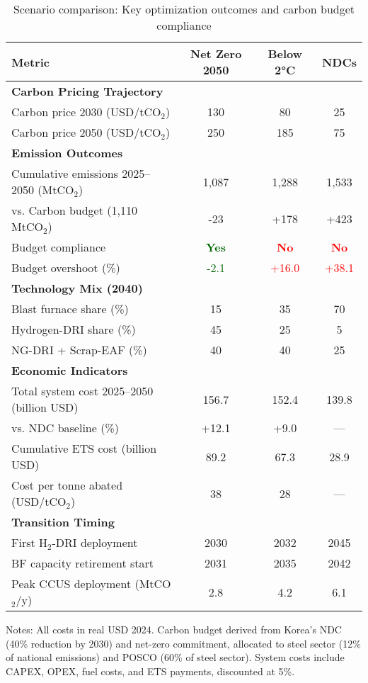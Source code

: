 \begin{table}[ht]
  \centering
  \caption{Scenario comparison: Key optimization outcomes and carbon budget compliance}
  \label{tab:scenario-comparison}
  \begin{threeparttable}
  \begin{tabular}{@{}lccc@{}}
    \toprule
    Metric & Net Zero 2050 & Below 2°C & NDCs \\
    \midrule
    \multicolumn{4}{l}{\textbf{Carbon Pricing Trajectory}} \\
    Carbon price 2030 (USD/tCO$_2$) & 130 & 80 & 25 \\
    Carbon price 2050 (USD/tCO$_2$) & 250 & 185 & 75 \\
    \midrule
    \multicolumn{4}{l}{\textbf{Emission Outcomes}} \\
    Cumulative emissions 2025--2050 (MtCO$_2$) & 1,087 & 1,288 & 1,533 \\
    vs. Carbon budget (1,110 MtCO$_2$) & -23 & +178 & +423 \\
    Budget compliance & \textcolor{darkgreen}{\textbf{Yes}} & \textcolor{red}{\textbf{No}} & \textcolor{red}{\textbf{No}} \\
    Budget overshoot (\%) & \textcolor{darkgreen}{-2.1} & \textcolor{red}{+16.0} & \textcolor{red}{+38.1} \\
    \midrule
    \multicolumn{4}{l}{\textbf{Technology Mix (2040)}} \\
    Blast furnace share (\%) & 15 & 35 & 70 \\
    Hydrogen-DRI share (\%) & 45 & 25 & 5 \\
    NG-DRI + Scrap-EAF (\%) & 40 & 40 & 25 \\
    \midrule
    \multicolumn{4}{l}{\textbf{Economic Indicators}} \\
    Total system cost 2025--2050 (billion USD) & 156.7 & 152.4 & 139.8 \\
    vs. NDC baseline (\%) & +12.1 & +9.0 & --- \\
    Cumulative ETS cost (billion USD) & 89.2 & 67.3 & 28.9 \\
    Cost per tonne abated (USD/tCO$_2$) & 38 & 28 & --- \\
    \midrule
    \multicolumn{4}{l}{\textbf{Transition Timing}} \\
    First H$_2$-DRI deployment & 2030 & 2032 & 2045 \\
    BF capacity retirement start & 2031 & 2035 & 2042 \\
    Peak CCUS deployment (MtCO$_2$/y) & 2.8 & 4.2 & 6.1 \\
    \bottomrule
  \end{tabular}
  \begin{tablenotes}
    \footnotesize
    \item Notes: All costs in real USD 2024. Carbon budget derived from Korea's NDC (40\% reduction by 2030) and net-zero commitment, allocated to steel sector (12\% of national emissions) and POSCO (60\% of steel sector). System costs include CAPEX, OPEX, fuel costs, and ETS payments, discounted at 5\%.
  \end{tablenotes}
  \end{threeparttable}
\end{table}